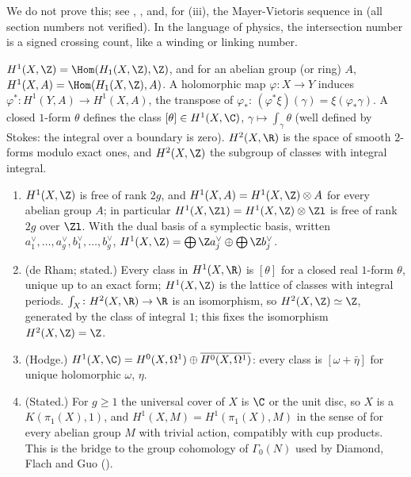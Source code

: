 We do not prove this; see \cite[Chapter VIII, Section 1]{Miranda}, \cite[Section 21]{Forster81}, \cite[Chapter III, Section 1]{FarkasKra92} and, for (iii), the
Mayer-Vietoris sequence in \cite[Chapter 2]{Hatcher02} (all section numbers not verified). In the language of physics, the intersection number is a signed
crossing count, like a winding or linking number.

\begin{definition}\label{def:curves:cohomology}
$H^1(X,\Z)=\Hom(H_1(X,\Z),\Z)$, and for an abelian group (or ring) $A$, $H^1(X,A)=\Hom(H_1(X,\Z),A)$. A holomorphic map $\varphi\colon X\to Y$ induces
$\varphi^*\colon H^1(Y,A)\to H^1(X,A)$, the transpose of $\varphi_*$: $(\varphi^*\xi)(\gamma)=\xi(\varphi_*\gamma)$. A closed $1$-form $\theta$ defines the class $[\theta]\in H^1(X,\C)$,
$\gamma\mapsto\int_\gamma\theta$ (well defined by Stokes: the integral over a boundary is zero). $H^2(X,\R)$ is the space of smooth $2$-forms modulo exact ones, and $H^2(X,\Z)$
the subgroup of classes with integral integral.
\end{definition}

\begin{proposition}\label{prop:curves:cohomology}
\leavevmode
\begin{enumerate}[label=(\roman*)]
\item $H^1(X,\Z)$ is free of rank $2g$, and $H^1(X,A)=H^1(X,\Z)\otimes A$ for every abelian group $A$; in particular $H^1(X,\Zl)=H^1(X,\Z)\otimes\Zl$ is free of rank $2g$ over
$\Zl$. With the dual basis of a symplectic basis, written $a_1^\vee,\dots,a_g^\vee,b_1^\vee,\dots,b_g^\vee$, $H^1(X,\Z)=\bigoplus\Z a_j^\vee\oplus\bigoplus\Z b_j^\vee$.
\item (de Rham; stated.) Every class in $H^1(X,\R)$ is $[\theta]$ for a closed real $1$-form $\theta$, unique up to an exact form; $H^1(X,\Z)$ is the lattice of classes with
integral periods. $\int_X\colon H^2(X,\R)\to\R$ is an isomorphism, so $H^2(X,\Z)\simeq\Z$, generated by the class of integral $1$; this fixes the isomorphism $H^2(X,\Z)=\Z$.
\item (Hodge.) $H^1(X,\C)=H^0(X,\Omega^1)\oplus\overline{H^0(X,\Omega^1)}$: every class is $[\omega+\bar\eta]$ for unique holomorphic $\omega$, $\eta$.
\item (Stated.) For $g\ge1$ the universal cover of $X$ is $\C$ or the unit disc, so $X$ is a $K(\pi_1(X),1)$, and $H^1(X,M)=H^1(\pi_1(X),M)$ in the sense of 
for every abelian group $M$ with trivial action, compatibly with cup products. This is the bridge to the group cohomology of $\Gamma_0(N)$ used by Diamond, Flach and Guo
().
\end{enumerate}
\end{proposition}

